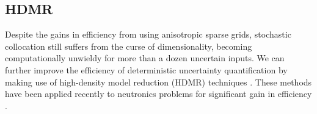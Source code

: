 \documentclass[11pt]{article}
\begin{document}
%
%



\subsection{HDMR}
Despite the gains in efficiency from using anisotropic sparse grids, stochastic collocation still suffers from the curse of dimensionality, becoming computationally unwieldy for more than a dozen uncertain inputs.  We can further improve the efficiency of deterministic uncertainty quantification by making use of high-density model reduction (HDMR) techniques \cite{hdmr}.  These methods have been applied recently to neutronics problems for significant gain in efficiency \cite{hdmr_neutron}.\\
\end{document}
